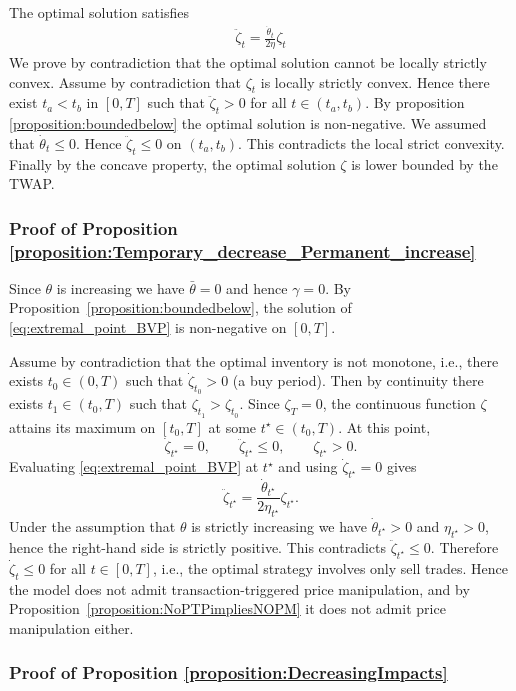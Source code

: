\documentclass[final,3p,authoryear,12pt]{elsarticle}
\begin{document}
The optimal solution satisfies 
\begin{eqnarray}
    \ddot \zeta_{t} = \frac{\dot \theta_{t}}{2\eta}\zeta_{t}
\end{eqnarray}
We prove by contradiction that the optimal solution cannot be locally strictly convex. Assume by contradiction that $\zeta_t$ is locally strictly convex. Hence there exist $t_{a}<t_{b}$ in $[0,T]$ such that $\ddot \zeta_{t} > 0$ for all $t\in(t_{a},t_{b})$. By proposition \ref{proposition:boundedbelow} the optimal solution is non-negative. We assumed that $\dot \theta_{t}\le0$. Hence $\ddot \zeta_{t} \le 0$ on $(t_{a},t_{b})$. This contradicts the local strict convexity. Finally by the concave property, the optimal solution $\zeta$ is lower bounded by the TWAP.   


\subsubsection{Proof of Proposition \ref{proposition:Temporary_decrease_Permanent_increase}}

Since $\theta$ is increasing we have $\bar\theta=0$ and hence $\gamma=0$. By
Proposition~\ref{proposition:boundedbelow}, the solution of
\eqref{eq:extremal_point_BVP} is non-negative on $[0,T]$.

Assume by contradiction that the optimal inventory is not monotone, i.e., there
exists $t_{0}\in(0,T)$ such that $\dot \zeta_{t_{0}}>0$ (a buy period). Then by
continuity there exists $t_{1}\in(t_{0},T)$ such that $\zeta_{t_{1}}>\zeta_{t_{0}}$.
Since $\zeta_{T}=0$, the continuous function $\zeta$ attains its maximum on
$[t_{0},T]$ at some $t^{\star}\in(t_{0},T)$. At this point,
\[
\dot \zeta_{t^{\star}}=0,\qquad \ddot \zeta_{t^{\star}}\le 0,\qquad
\zeta_{t^{\star}}>0.
\]
Evaluating \eqref{eq:extremal_point_BVP} at $t^{\star}$ and using
$\dot\zeta_{t^{\star}}=0$ gives
\[
\ddot \zeta_{t^{\star}}
=\frac{\dot\theta_{t^{\star}}}{2\eta_{t^{\star}}}\zeta_{t^{\star}}.
\]
Under the assumption that $\theta$ is strictly increasing we have
$\dot\theta_{t^{\star}}>0$ and $\eta_{t^{\star}}>0$, hence the right-hand side is
strictly positive. This contradicts $\ddot \zeta_{t^{\star}}\le 0$. Therefore
$\dot \zeta_{t}\le 0$ for all $t\in[0,T]$, i.e., the optimal strategy involves
only sell trades. Hence the model does not admit transaction-triggered price
manipulation, and by Proposition~\ref{proposition:NoPTPimpliesNOPM} it does not
admit price manipulation either.

\subsubsection{Proof of Proposition \ref{proposition:DecreasingImpacts}}
\end{document}
